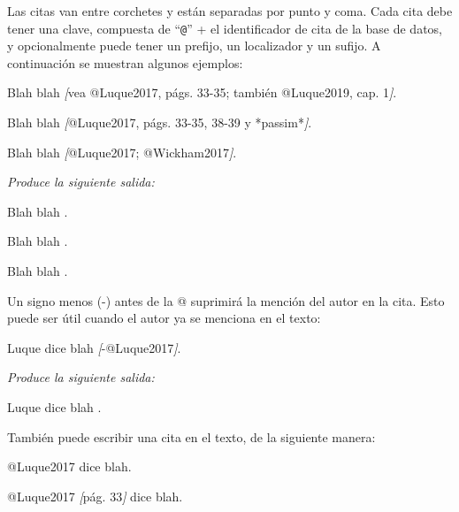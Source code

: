 \documentclass[12pt,a4paper,]{book}
\newenvironment{Shaded}{\begin{snugshade}}{\end{snugshade}}
\newcommand{\CommentTok}[1]{\textcolor[rgb]{0.56,0.35,0.01}{\textit{#1}}}
\newcommand{\NormalTok}[1]{#1}
\newcommand{\OtherTok}[1]{\textcolor[rgb]{0.56,0.35,0.01}{#1}}
\numberwithin{dummy}{section}
\theoremstyle{ocrenumbox}
\theoremstyle{blacknumex}
\theoremstyle{blacknumbox}
\theoremstyle{ocrenum}
\theoremstyle{ocrenum}
\begin{document}
Las citas van entre corchetes y están separadas por punto y coma. Cada
cita debe tener una clave, compuesta de ``\texttt{@}'' + el
identificador de cita de la base de datos, y opcionalmente puede tener
un prefijo, un localizador y un sufijo. A continuación se muestran
algunos ejemplos:

\begin{Shaded}
\begin{Highlighting}[]
\NormalTok{Blah blah }\CommentTok{[}\OtherTok{vea @Luque2017, págs. 33{-}35; también @Luque2019, cap. 1}\CommentTok{]}\NormalTok{.}

\NormalTok{Blah blah }\CommentTok{[}\OtherTok{@Luque2017, págs. 33{-}35, 38{-}39 y *passim*}\CommentTok{]}\NormalTok{.}

\NormalTok{Blah blah }\CommentTok{[}\OtherTok{@Luque2017; @Wickham2017}\CommentTok{]}\NormalTok{.}
\end{Highlighting}
\end{Shaded}

\emph{Produce la siguiente salida:}

Blah blah \citetext{\citealp[vea][págs.
33-35]{Luque2017}; \citealp[también][cap. 1]{Luque2019}}.

Blah blah \citep[págs. 33-35, 38-39 y \emph{passim}]{Luque2017}.

Blah blah \citep{Luque2017, Wickham2017}.

Un signo menos (-) antes de la @ suprimirá la mención del autor en la
cita. Esto puede ser útil cuando el autor ya se menciona en el texto:

\begin{Shaded}
\begin{Highlighting}[]
\NormalTok{Luque dice blah }\CommentTok{[}\OtherTok{{-}@Luque2017}\CommentTok{]}\NormalTok{.}
\end{Highlighting}
\end{Shaded}

\emph{Produce la siguiente salida:}

Luque dice blah \citeyearpar{Luque2017}.

También puede escribir una cita en el texto, de la siguiente manera:

\begin{Shaded}
\begin{Highlighting}[]
\NormalTok{@Luque2017 dice blah.}

\NormalTok{@Luque2017 }\CommentTok{[}\OtherTok{pág. 33}\CommentTok{]}\NormalTok{ dice blah.}
\end{Highlighting}
\end{Shaded}
\end{document}
